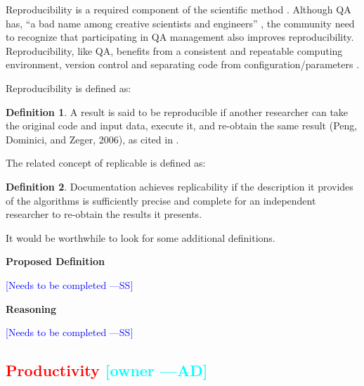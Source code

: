 \documentclass[letterpaper,cleveref]{lipics-v2019}
\newcommand{\authornote}[3]{\textcolor{#1}{[#3 ---#2]}}
\newcommand{\authornote}[3]{}
\newcommand{\wss}[1]{\authornote{blue}{SS}{#1}} %
\newcommand{\ad}[1]{\authornote{cyan}{AD}{#1}} %
\newcommand{\notdone}[1]{\textcolor{red}{#1}}
\theoremstyle{definition}
\newtheorem{defn}{Definition}
\begin{document}
Reproducibility is a required component of the scientific
method \citep{Davison2012}.  Although QA has, ``a bad name among creative
scientists and engineers'' \citep[p.~352]{Roache1998}, the community need to
recognize that participating in QA management also improves reproducibility.
Reproducibility, like QA, benefits from a consistent and repeatable computing
environment, version control and separating code from
configuration/parameters \citep{Davison2012}.

Reproducibility is defined as:

\begin{defn}
	A result is said to be reproducible if another researcher can take the original
	code and input data, execute it, and re-obtain the same result (Peng, Dominici,
	and Zeger, 2006), as cited in \citet{BenureauAndRougier2017}.
\end{defn}

The related concept of replicable is defined as:

\begin{defn}
	Documentation achieves replicability if the description it provides of the
	algorithms is sufficiently precise and complete for an independent researcher to
	re-obtain the results it presents.  \citep{BenureauAndRougier2017}
\end{defn}

It would be worthwhile to look for some additional definitions.

\noindent \textbf{Proposed Definition} 

\wss{Needs to be completed}

\noindent \textbf{Reasoning}

\wss{Needs to be completed}

\subsection{\notdone{Productivity} \ad{owner}}
\end{document}
